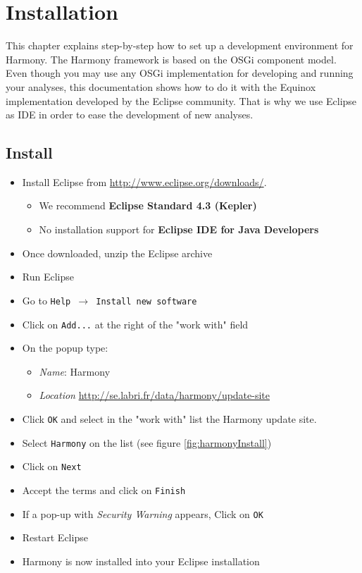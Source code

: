 \chapter{Installation}\label{chap:install}

This chapter explains step-by-step how to set up a development environment for Harmony.  The Harmony framework is based on the OSGi component model. Even though you may use any OSGi implementation for developing and running your analyses, this documentation shows how to do it with the Equinox implementation developed by the Eclipse community. That is why we use Eclipse as IDE in order to ease the development of new analyses.


\section{Install}

\begin{itemize}
	\item Install Eclipse from \url{http://www.eclipse.org/downloads/}. 
		\begin{itemize}
			\item We recommend {\color{ggreen}\textbf{Eclipse Standard 4.3 (Kepler)}}
			\item No installation support for {\color{gred}\textbf{Eclipse IDE for Java Developers}}
		\end{itemize}
			\item Once downloaded, unzip the Eclipse archive
			\item Run Eclipse
			\item Go to \texttt{Help $\rightarrow$ Install new software}
			\item Click on \texttt{Add...} at the right of the "work with" field
			\item On the popup type:
			\begin{itemize}
				\item \emph{Name}: Harmony
				\item \emph{Location} \url{http://se.labri.fr/data/harmony/update-site}
			\end{itemize}
			\item Click \texttt{OK} and select in the "work with" list the Harmony update site.
			\item Select \texttt{Harmony} on the list (see figure \ref{fig:harmonyInstall})
			\item Click on \texttt{Next}
			\item Accept the terms and click on \texttt{Finish}
			\item If a pop-up with \emph{Security Warning} appears, Click on \texttt{OK}
			\item Restart Eclipse
			\item Harmony is now installed into your Eclipse installation
\end{itemize}



